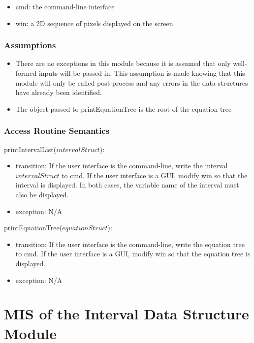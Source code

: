 \documentclass[12pt, titlepage]{article}
\begin{document}
\begin{itemize}
	\item cmd: the command-line interface
	\item win: a 2D sequence of pixels displayed on the screen
\end{itemize}

\subsubsection{Assumptions}

\begin{itemize}
	\item There are no exceptions in this module because it is assumed that 
	only well-formed inputs will be passed in. This assumption is made knowing 
	that this module will only be called post-process and any errors in the 
	data structures have already been identified.
	\item The object passed to printEquationTree is the root of the equation 
	tree
\end{itemize}


\subsubsection{Access Routine Semantics}

\noindent printIntervalList($intervalStruct$):
\begin{itemize}
	\item transition: If the user interface is the command-line, write the 
	interval $intervalStruct$ to cmd. If the user interface is a GUI, modify 
	win so that the interval is displayed. In both cases, the variable name of 
	the interval must also be displayed.
	\item exception: N/A
\end{itemize}

\noindent printEquationTree($equationStruct$):
\begin{itemize}
	\item transition: If the user interface is the command-line, write the 
	equation tree to cmd. If the user interface is a GUI, modify win so that 
	the equation tree is displayed.
	\item exception: N/A
\end{itemize}

\newpage

\section{MIS of the Interval Data Structure Module} 
\label{Module_intervaldatastructure}
\end{document}
